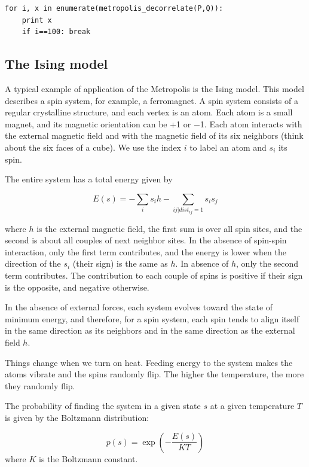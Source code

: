 \documentclass[justified,sixbynine]{tufte-book}
\theoremstyle{plain}%
\theoremstyle{definition}
\theoremstyle{remark}
\begin{document}
\begin{fullwidth}
\begin{lstlisting}
for i, x in enumerate(metropolis_decorrelate(P,Q)):
    print x
    if i==100: break
\end{lstlisting}


\subsection{The Ising model}

A typical example of application of the Metropolis is the Ising model. This model describes a spin system, for example, a ferromagnet. A spin system consists of a regular crystalline structure, and each vertex is an atom. Each atom is a small magnet, and its magnetic orientation can be +1 or $-$1. Each atom interacts with the external magnetic field and with the magnetic field of its six neighbors (think about the six faces of a cube). We use the index $i$ to label an atom and $s_i$ its spin.

The entire system has a total energy given by

\begin{equation}
E(s) = - \sum_i s_i h - \sum_{ij|dist_{ij}=1} s_i s_j
\end{equation}

where $h$ is the external magnetic field, the first sum is over all spin sites, and the second is about all couples of next neighbor sites. In the absence of spin-spin interaction, only the first term contributes, and the energy is lower when the direction of the $s_i$ (their sign) is the same as $h$. In absence of $h$, only the second term contributes. The contribution to each couple of spins is positive if their sign is the opposite, and negative otherwise.

In the absence of external forces, each system evolves toward the state of minimum energy, and therefore, for a spin system, each spin tends to align itself in the same direction as its neighbors and in the same direction as the external field $h$.

Things change when we turn on heat. Feeding energy to the system makes the atoms vibrate and the spins randomly flip. The higher the temperature, the more they randomly flip.

The probability of finding the system in a given state $s$ at a given temperature $T$ is given by the Boltzmann distribution:

\begin{equation}
p(s) = \exp\left(-\frac{E(s)}{KT}\right)
\end{equation}
where $K$ is the Boltzmann constant.


\end{fullwidth}
\end{document}
